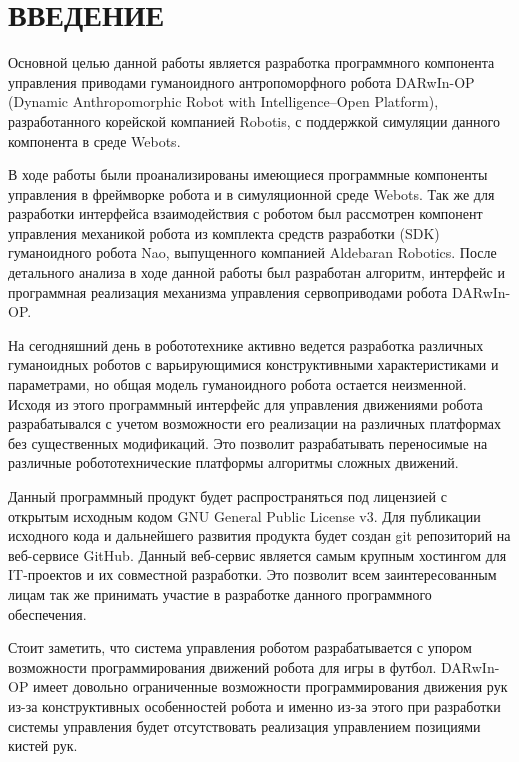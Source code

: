 \chapter*{ВВЕДЕНИЕ}

Основной целью данной работы является разработка программного компонента управления приводами гуманоидного антропоморфного робота DARwIn-OP (Dynamic Anthropomorphic Robot with Intelligence–Open Platform), разработанного корейской компанией  Robotis, с поддержкой симуляции данного компонента в среде Webots.

В ходе работы были проанализированы имеющиеся программные компоненты управления в фреймворке робота и в симуляционной среде Webots. Так же для разработки интерфейса взаимодействия с роботом был рассмотрен компонент управления механикой робота из комплекта средств разработки (SDK) гуманоидного робота Nao, выпущенного компанией Aldebaran Robotics. После детального анализа в ходе данной работы был разработан алгоритм, интерфейс и программная реализация механизма управления сервоприводами робота DARwIn-OP.

На сегодняшний день в робототехнике активно ведется разработка различных гуманоидных роботов с варьирующимися конструктивными характеристиками и параметрами, но общая модель гуманоидного робота остается неизменной. Исходя из этого программный интерфейс для управления движениями робота разрабатывался с учетом возможности его реализации на различных платформах без существенных модификаций. Это позволит разрабатывать переносимые на различные робототехнические платформы алгоритмы сложных движений.

Данный программный продукт будет распространяться под лицензией с открытым исходным кодом GNU General Public License v3. Для публикации исходного кода и дальнейшего развития продукта будет создан git репозиторий на веб-сервисе GitHub. Данный веб-сервис является самым крупным хостингом для IT-проектов и их совместной разработки. Это позволит всем заинтересованным лицам так же принимать участие в разработке данного программного обеспечения.

Стоит заметить, что система управления роботом разрабатывается с упором возможности программирования движений робота для игры в футбол. DARwIn-OP имеет довольно ограниченные возможности программирования движения рук из-за конструктивных особенностей робота и именно из-за этого при разработки системы управления будет отсутствовать реализация управлением позициями кистей рук.
